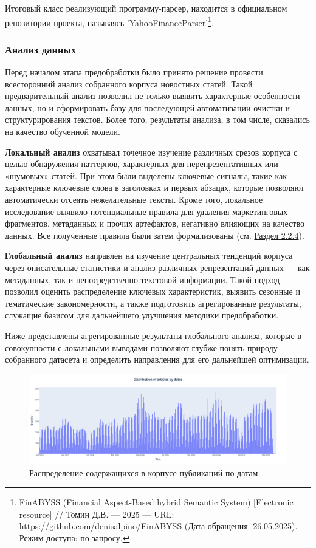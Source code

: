 Итоговый класс реализующий программу-парсер, находится в официальном репозитории проекта, называясь
'YahooFinanceParser'\footnote{FinABYSS (Financial Aspect-Based hybrid Semantic System) [Electronic resource] //
Томин Д.В. --- 2025 --- URL: \url{https://github.com/denisalpino/FinABYSS} (Дата обращения: 26.05.2025). --- Режим доступа: по запросу.}.

\subsubsection{Анализ данных}
\label{sec:data_analysis}
Перед началом этапа предобработки было принято решение провести всесторонний анализ собранного корпуса новостных статей.
Такой предварительный анализ позволил не только выявить характерные особенности данных, но и сформировать базу для последующей
автоматизации очистки и структурирования текстов. Более того, результаты анализа, в том числе, сказались на качество обученной
модели.


\textbf{Локальный анализ} охватывал точечное изучение различных срезов корпуса с целью обнаружения паттернов,
характерных для нерепрезентативных или «шумовых» статей. При этом были выделены ключевые сигналы, такие как
характерные ключевые слова в заголовках и первых абзацах, которые позволяют автоматически отсеять нежелательные
тексты. Кроме того, локальное исследование выявило потенциальные правила для удаления маркетинговых фрагментов,
метаданных и прочих артефактов, негативно влияющих на качество данных. Все полученные правила были затем
формализованы (см. \hyperref[sec:data_prep]{Раздел 2.2.4}).

\textbf{Глобальный анализ} направлен на изучение центральных тенденций корпуса через описательные статистики
и анализ различных репрезентаций данных --- как метаданных, так и непосредственно текстовой информации.
Такой подход позволил оценить распределение ключевых характеристик, выявить сезонные и тематические
закономерности, а также подготовить агрегированные результаты, служащие базисом для дальнейшего улучшения
методики предобработки.

Ниже представлены агрегированные результаты глобального анализа, которые в совокупности с локальными выводами
позволяют глубже понять природу собранного датасета и определить направления для его дальнейшей оптимизации.

\begin{figure}[H]
    \centering
    \includegraphics[width=1\linewidth]{img/articles_dist_by_dates.png}
    \caption{Распределение содержащихся в корпусе публикаций по датам.}
    \label{fig:dist_by_dates}
\end{figure}

